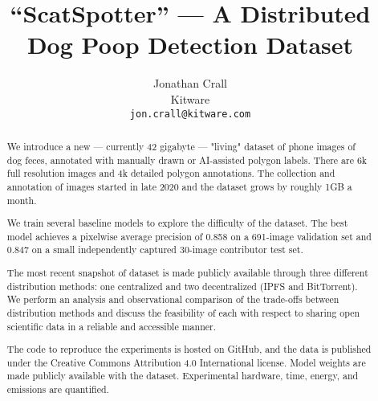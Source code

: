 \documentclass[10pt,twocolumn,letterpaper]{article}
\begin{document}
\title{``ScatSpotter'' --- A Distributed Dog Poop Detection Dataset}

\author{Jonathan Crall\\
Kitware\\
{\tt\small jon.crall@kitware.com}
}
\maketitle

\begin{abstract}

We introduce a new --- currently 42 gigabyte --- "living" dataset of phone images of dog feces, annotated with manually drawn or AI-assisted polygon labels. There are 6k full resolution images and 4k detailed polygon annotations. The collection and annotation of images started in late 2020 and the dataset grows by roughly 1GB a month. 

We train several baseline models to explore the difficulty of the dataset.
The best model achieves a pixelwise average precision of 0.858 on a 691-image
validation set and 0.847 on a small independently captured 30-image contributor
test set.

The most recent snapshot of dataset is made publicly available through three different distribution methods: one centralized and two decentralized (IPFS and BitTorrent).  We perform an analysis and observational comparison of the trade-offs between distribution methods and discuss the feasibility of each with respect to sharing open scientific data in a reliable and accessible manner.

The code to reproduce the experiments is hosted on GitHub, and the data is published under the Creative Commons Attribution 4.0 International license.  Model weights are made publicly available with the dataset. Experimental hardware, time, energy, and emissions are quantified.

\end{abstract}
\end{document}
